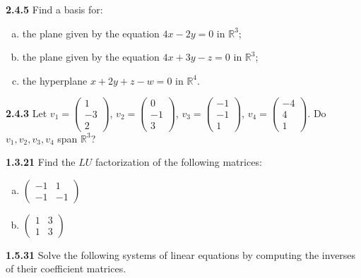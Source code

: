 \documentclass{article}
\begin{document}
\textbf{2.4.5}
Find a basis for:
\begin{enumerate}[(a)]
    \item the plane given by the equation \(4x - 2y = 0\) in \(\mathbb{R}^3\);
    \item the plane given by the equation \(4x + 3y - z = 0\) in \(\mathbb{R}^3\);
    \item the hyperplane \(x + 2y + z - w = 0\) in \(\mathbb{R}^4\).
\end{enumerate}
\vspace{10pt}

\textbf{2.4.3}
Let \(v_1 = \begin{pmatrix} 1 \\ -3 \\ 2 \end{pmatrix}\), \(v_2 = \begin{pmatrix} 0 \\ -1 \\ 3 \end{pmatrix}\), \(v_3 = \begin{pmatrix} -1 \\ -1 \\ 1 \end{pmatrix}\), \(v_4 = \begin{pmatrix} -4 \\ 4 \\ 1 \end{pmatrix}\). Do \(v_1, v_2, v_3, v_4\) span \(\mathbb{R}^3\)?
\vspace{10pt}

\textbf{1.3.21} Find the \(LU\) factorization of the following matrices:
\begin{enumerate}[(a)]
    \item \(\begin{pmatrix} -1 & 1 \\ -1 & -1 \end{pmatrix}\)
    \item \(\begin{pmatrix} 1 & 3 \\ 1 & 3 \end{pmatrix}\)
\end{enumerate}
\vspace{10pt}

\textbf{1.5.31} Solve the following systems of linear equations by computing the inverses of their coefficient matrices.
\vspace{10pt}
\end{document}

